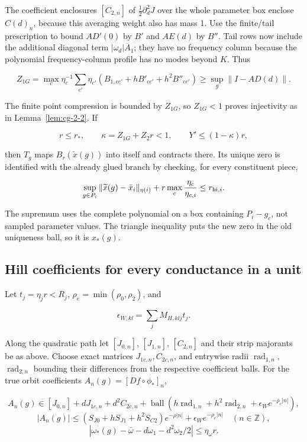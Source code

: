 \documentclass[11pt]{article}
\theoremstyle{definition}
\begin{document}
The coefficient enclosures $[C_{2,n}]$ of $\tfrac12\partial_d^2J$ over the whole parameter box enclose $C(d)_n$, because this averaging weight also has mass 1. Use the finite/tail prescription to bound $AD'(0)$ by $B'$ and $AE(d)$ by $B''$. Tail rows now include the additional diagonal term $|\omega_d|\overline A_1$; they have no frequency column because the polynomial frequency-column profile has no modes beyond $K$. Thus

\[
 Z_{1G}=\max_c\eta_c^{-1}\sum_{c'}\eta_{c'}
 (B_{1,cc'}+hB'_{cc'}+h^2B''_{cc'})
 \ge\sup_g\|I-AD(d)\|.
\]

The finite point compression is bounded by $Z_{1G}$, so $Z_{1G}<1$ proves injectivity as in Lemma~\ref{lem:cg-2-2}. If

\[
 r\le r_*,\qquad \kappa=Z_{1G}+Z_2r<1,\qquad
 Y'\le(1-\kappa)r,
\]

then $T_g$ maps $B_r(\widetilde x(g))$ into itself and contracts there. Its unique zero is identified with the already glued branch by checking, for every constituent piece,

\[
 \sup_{g\in P_i}\|\widetilde x(g)-\bar x_i\|_{\eta(i)}
 +r\max_c\frac{\eta_c}{\eta_{c,i}}\le r_{{\rm hi},i}.
\]

The supremum uses the complete polynomial on a box containing $P_i-g_c$, not sampled parameter values. The triangle inequality puts the new zero in the old uniqueness ball, so it is $x_*(g)$.

\subsection{Hill coefficients for every conductance in a unit}\label{sec:cg-6}

Let $t_j=\eta_jr<R_j$, $\rho_e=\min(\rho_0,\rho_2)$, and

\[
 \epsilon_{W,kl}=\sum_jM_{H,klj}t_j.
\]

Along the quadratic path let $[J_{0,n}]$, $[J_{1,n}]$, $[C_{2,n}]$ and their strip majorants be as above. Choose exact matrices $J_{1c,n},C_{2c,n}$, and entrywise radii $\operatorname{rad}_{1,n}$, $\operatorname{rad}_{2,n}$ bounding their differences from the respective coefficient balls. For the true orbit coefficients $A_n(g)=[Df\circ\phi_*]_n$,

\[
 A_n(g)\in[J_{0,n}]+dJ_{1c,n}+d^2C_{2c,n}
 +\operatorname{ball}(h\operatorname{rad}_{1,n}+h^2\operatorname{rad}_{2,n}
                         +\epsilon_W e^{-\rho_e|n|}),
\]
\[
 |A_n(g)|\le(S_{J0}+hS_{J1}+h^2S_{C2})e^{-\rho|n|}
                 +\epsilon_W e^{-\rho_e|n|}\quad(n\in\mathbb Z),
\]
\[
 |\omega_*(g)-\bar\omega-d\omega_1-d^2\omega_2/2|\le\eta_\omega r.
\]
\end{document}

